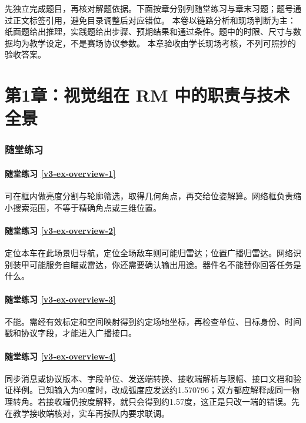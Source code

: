 \begingroup
\setlength{\emergencystretch}{3em}
先独立完成题目，再核对解题依据。下面按章分别列随堂练习与章末习题；题号通过正文标签引用，避免目录调整后对应错位。
本卷以链路分析和现场判断为主：纸面题给出推理，实践题给出步骤、预期结果和通过条件。题中的时限、尺寸与数据均为教学设定，不是赛场协议参数。
本章验收由学长现场考核，不列可照抄的验收答案。
\section*{第1章：视觉组在 RM 中的职责与技术全景}
{}
\subsubsection*{随堂练习}
\paragraph*{随堂练习 \ref{v3-ex-overview-1}}
\begin{solution}
可在框内做亮度分割与轮廓筛选，取得几何角点，再交给位姿解算。网络框负责缩小搜索范围，不等于精确角点或三维位置。
\end{solution}

\paragraph*{随堂练习 \ref{v3-ex-overview-2}}
\begin{solution}
定位本车在此场景归导航，定位全场敌车则可能归雷达；位置广播归雷达。网络识别装甲可能服务自瞄或雷达，你还需要确认输出用途。器件名不能替你回答任务是什么。
\end{solution}

\paragraph*{随堂练习 \ref{v3-ex-overview-3}}
\begin{solution}
不能。需经有效标定和空间映射得到约定场地坐标，再检查单位、目标身份、时间戳和协议字段，才能进入广播接口。
\end{solution}

\paragraph*{随堂练习 \ref{v3-ex-overview-4}}
\begin{solution}
同步消息或协议版本、字段单位、发送端转换、接收端解析与限幅、接口文档和验证样例。已知输入为90度时，改成弧度应发送约1.570796；双方都应解释成同一物理转角。若接收端仍按度解释，就只会得到约1.57度，这正是只改一端的错误。先在教学接收端核对，实车再按队内要求联调。
\end{solution}


